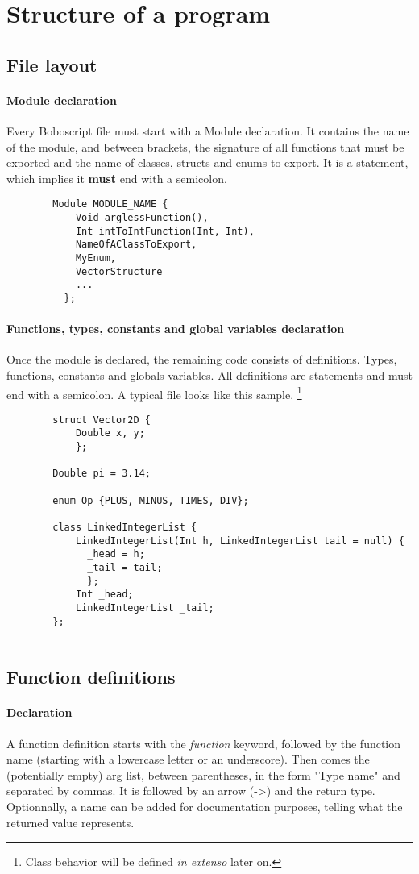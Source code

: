 \documentclass[a4paper, 12pt]{article}
\begin{document}
	\newpage
	\section{Structure of a program}
	\subsection{File layout}
	\paragraph{Module declaration}
	Every Boboscript file must start with a Module declaration. It contains the name of the module, and between brackets, the signature of all functions that must be exported and the name of classes, structs and enums to export. It is a statement, which implies it \textbf{must} end with a semicolon.
	\begin{verbatim}
		Module MODULE_NAME {
		    Void arglessFunction(),
		    Int intToIntFunction(Int, Int),
		    NameOfAClassToExport,
		    MyEnum,
		    VectorStructure
		    ...
		  };
	\end{verbatim}
	\paragraph{Functions, types, constants and global variables declaration}
	Once the module is declared, the remaining code consists of definitions. Types, functions, constants and globals variables. All definitions are statements and must end with a semicolon.
	A typical file looks like this sample. \footnote{Class behavior will be defined \textit{in extenso} later on.}
	\begin{verbatim}
		struct Vector2D {
		    Double x, y;
		    };
		    
		Double pi = 3.14;
		
		enum Op {PLUS, MINUS, TIMES, DIV};
		
		class LinkedIntegerList {
		    LinkedIntegerList(Int h, LinkedIntegerList tail = null) {
		      _head = h;
		      _tail = tail;
		      };
		    Int _head;
		    LinkedIntegerList _tail;
		};
		
	\end{verbatim}
	
	\subsection{Function definitions}
	\paragraph{Declaration}
	A function definition starts with the \textit{function} keyword, followed by the function name (starting with a lowercase letter or an underscore). Then comes the (potentially empty) arg list, between parentheses, in the form "Type name" and separated by commas. It is followed by an arrow (->) and the return type. Optionnally, a name can be added for documentation purposes, telling what the returned value represents.
	
\end{document}
